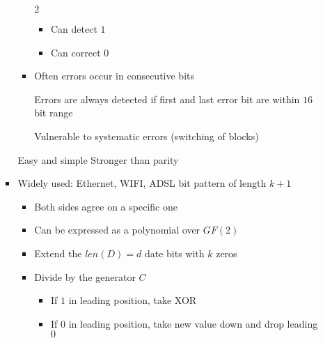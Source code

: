 \begin{itemize}
\begin{itemize}
\begin{itemize}
\begin{itemize}
                             $2$
                                \begin{itemize}
                                    \item Can detect $1$
                                    \item Can correct $0$
                                \end{itemize}
                            \item Often errors occur in consecutive bits
                                \begin{itemize}
                                    \ipro Errors are always detected if first and last error bit are within $16$ bit range
                                \end{itemize}
                            \icon Vulnerable to systematic errors (switching of blocks)
                        \end{itemize}
                    \ipro Easy and simple
                    \ipro Stronger than parity
                \end{itemize}
                \begin{itemize}
                    \item Widely used: Ethernet, WIFI, ADSL
                     bit pattern of length $k + 1$
                        \begin{itemize}
                            \item Both sides agree on a specific one
                            \item Can be expressed as a polynomial over $GF(2)$
                        \end{itemize}
                        \begin{itemize}
                            \item Extend the $len(D) = d$ date bits with $k$ zeros
                            \item Divide by the generator $C$
                                \begin{itemize}
                                    \item If $1$ in leading position, take XOR
                                    \item If $0$ in leading position, take new value down and drop leading $0$
                                \end{itemize}

\end{itemize}
\end{itemize}
\end{itemize}
\end{itemize}
